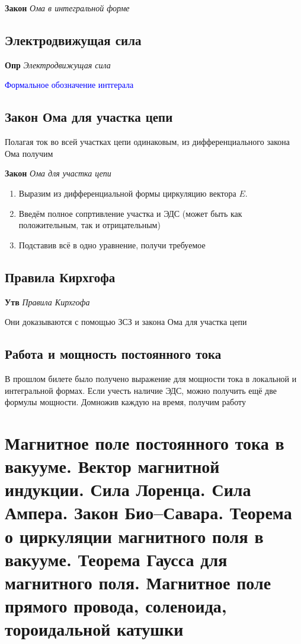 \documentclass[a4paper, 14pt]{article}
\begin{document}
    \textbf{Закон} \textit{Ома в интегральной форме}
    
    \subsection{Электродвижущая сила}
    
    \textbf{Опр} \textit{Электродвижущая сила}
    
    \textcolor{blue}{Формальное обозначение интгерала}
    
    \subsection{Закон Ома для участка цепи}
    
    Полагая ток во всей участках цепи одинаковым, из дифференциального закона Ома получим
    
    \textbf{Закон} \textit{Ома для участка цепи}
    
    \begin{enumerate}
        \item Выразим из дифференциальной формы циркуляцию вектора $E$.
        \item Введём полное сопртивление участка и ЭДС (может быть как положительным, так и отрицательным)
        \item Подставив всё в одно уравнение, получи требуемое
    \end{enumerate}
    
    \subsection{Правила Кирхгофа}
    
    \textbf{Утв} \textit{Правила Кирхгофа}
    
    Они доказываются с помощью ЗСЗ и закона Ома для участка цепи
    
    \subsection{Работа и мощность постоянного тока}
    
    В прошлом билете было получено выражение для мощности тока в локальной и интегральной формах.
    Если учесть наличие ЭДС, можно получить ещё две формулы мощности.
    Домножив каждую на время, получим работу
    
    \section{Магнитное поле постоянного тока в вакууме.
    Вектор магнитной индукции.
    Сила Лоренца.
    Сила Ампера.
    Закон Био–Савара.
    Теорема о циркуляции магнитного поля в вакууме.
    Теорема Гаусса для магнитного поля.
    Магнитное поле прямого провода, соленоида, тороидальной катушки}
    
\end{document}
